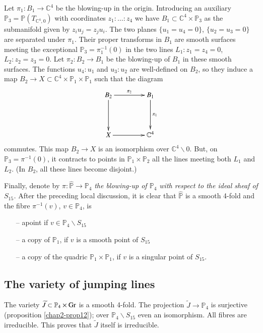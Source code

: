 Let $\pi_{1}:B_{1}\to \mathbb{C}^{4}$ be the blowing-up in the
origin. Introducing an auxiliary
$\mathbb{P}_{3}=\mathbb{P}(T_{\mathbb{C}^{4},0})$ with coordinates
$z_{1}:\ldots:z_{4}$ we have
$B_{1}\subset \mathbb{C}^{4}\times \mathbb{P}_{3}$ as the submanifold
given by $z_{i}u_{j}=z_{j}u_{i}$. The two planes $\{u_{1}=u_{4}=0\}$,
$\{u_{2}=u_{3}=0\}$ are separated under $\pi_{1}$. Their proper
transforms in $B_{1}$ are smooth surfaces meeting the exceptional
$\mathbb{P}_{3}=\pi^{-1}_{1}(0)$ in the two lines
$L_{1}:z_{1}=z_{4}=0$, $L_{2}:z_{2}=z_{3}=0$. Let $\pi_{2}:B_{2}\to
B_{1}$ be the blowing-up of $B_{1}$ in these smooth surfaces. The
functions $u_{4}:u_{1}$ and $u_{3}:u_{2}$ are well-defined on $B_{2}$,
so they induce a map $B_{2}\to
X\subset \mathbb{C}^{4}\times \mathbb{P}_{1}\times \mathbb{P}_{1}$
such that the diagram
\[
\xymatrix@=1.5cm{
B_{2}\ar[d]\ar[r]^-{\pi_{2}} & B_{1}\ar[d]^-{\pi_{1}}\\
X\ar[r] & \mathbb{C}^{4}
}
\]
commutes. This map $B_{2}\to X$ is an isomorphism over
$\mathbb{C}^{4}\backslash 0$. But, on $\mathbb{P}_{3}=\pi^{-1}(0)$, it
contracts to points in $\mathbb{P}_{1}\times \mathbb{P}_{2}$ all the
lines meeting both $L_{1}$ and $L_{2}$. (In $B_{2}$, all these lines
become disjoint.)

Finally, denote by $\pi:\widehat{\mathbb{P}}\to \mathbb{P}_{4}$ {\em
the blowing-up of $\mathbb{P}_{4}$ with respect to the ideal sheaf of
$S_{15}$.} After the preceding local discussion, it is clear that
$\widehat{\mathbb{P}}$ is a smooth 4-fold and the fibre $\pi^{-1}(v)$,
$v\in \mathbb{P}_{4}$, is 
\begin{itemize}
\item[--] a\pageoriginale point if $v\in \mathbb{P}_{4}\backslash S_{15}$

\item[--] a copy of $\mathbb{P}_{1}$, if $v$ is a smooth point of
$S_{15}$

\item[--] a copy of the quadric $\mathbb{P}_{1}\times \mathbb{P}_{1}$,
if $v$ is a singular point of $S_{15}$.
\end{itemize}


\subsection{The variety of jumping lines}\label{chap2-sec5.5}

The variety $\widetilde{J}\subset \mathbb{P}_{4}\times \operatorname{Gr}$ is a
smooth 4-fold. The projection $\widetilde{J}\to \mathbb{P}_{4}$ is
surjective (proposition \ref{chap2-prop12}); over
$\mathbb{P}_{4}\backslash S_{15}$ even an isomorphism. All fibres are
irreducible. This proves that $\widetilde{J}$ itself is irreducible.

